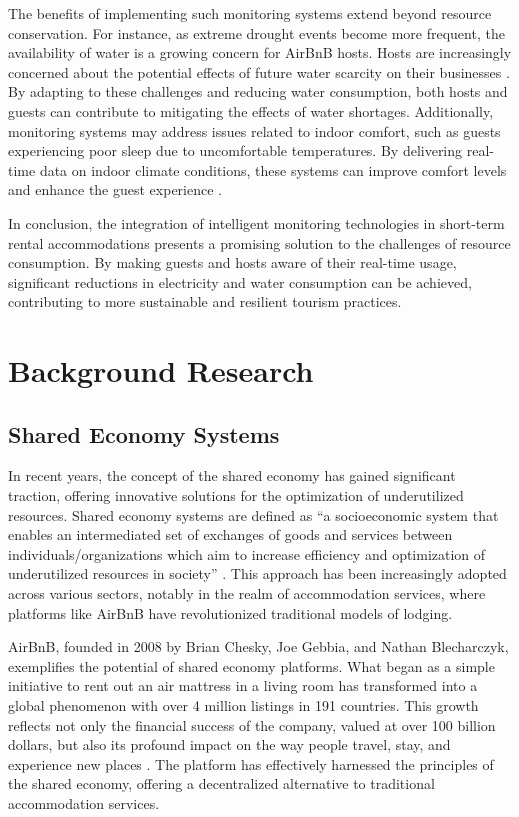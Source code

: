 The benefits of implementing such monitoring systems extend beyond resource conservation. For instance, as extreme 
drought events become more frequent, the availability of water is a growing concern for AirBnB hosts. Hosts are 
increasingly concerned about the potential effects of future water scarcity on their businesses \cite{Prinsloo2019}. 
By adapting to these challenges and reducing water consumption, both hosts and guests can contribute 
to mitigating the effects of water shortages. Additionally, monitoring systems may address issues related to indoor 
comfort, such as guests experiencing poor sleep due to uncomfortable temperatures. By delivering real-time data on 
indoor climate conditions, these systems can improve comfort levels and enhance the guest experience 
\cite{Pallesen2016}.

In conclusion, the integration of intelligent monitoring technologies in short-term rental accommodations presents a 
promising solution to the challenges of resource consumption. By making guests and hosts aware of their real-time usage, 
significant reductions in electricity and water consumption can be achieved, contributing to more sustainable and 
resilient tourism practices.

\section{Background Research}

\subsection{Shared Economy Systems}

In recent years, the concept of the shared economy has gained significant traction, offering innovative solutions for 
the optimization of underutilized resources. Shared economy systems are defined as “a socioeconomic system that enables 
an intermediated set of exchanges of goods and services between individuals/organizations which aim to increase 
efficiency and optimization of underutilized resources in society” \cite{Munoz2017}. This approach has been increasingly 
adopted across various sectors, notably in the realm of accommodation services, where platforms like AirBnB have 
revolutionized traditional models of lodging.

AirBnB, founded in 2008 by Brian Chesky, Joe Gebbia, and Nathan Blecharczyk, exemplifies the potential of shared economy 
platforms. What began as a simple initiative to rent out an air mattress in a living room has transformed into a global 
phenomenon with over 4 million listings in 191 countries. This growth reflects not only the financial success of the 
company, valued at over 100 billion dollars, but also its profound impact on the way people travel, stay, and experience 
new places \cite{Nadkarni2020}. The platform has effectively harnessed the principles of the shared economy, offering a 
decentralized alternative to traditional accommodation services.

